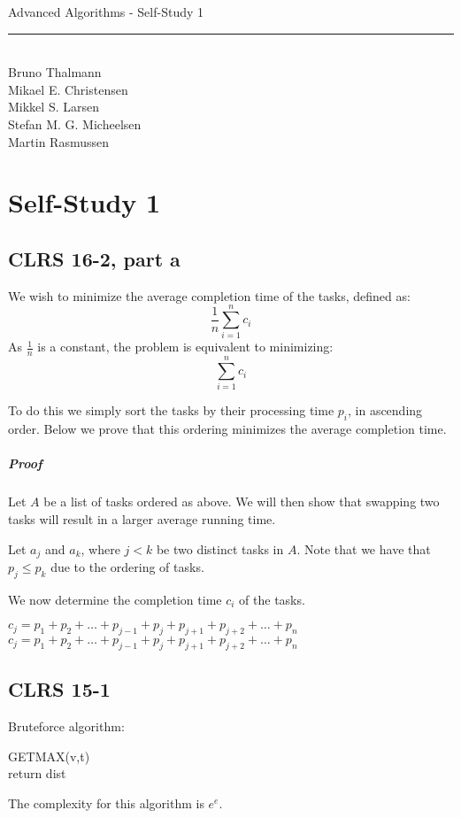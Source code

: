 
\newcommand{\HRule}{\rule{\linewidth}{0.5mm}}


\begin{titlepage}
\centering
{\LARGE Advanced Algorithms - Self-Study 1}
\HRule \\[0.5cm]
Bruno Thalmann\\
			Mikael E. Christensen\\
			Mikkel S. Larsen\\
			Stefan M. G. Micheelsen\\
			Martin Rasmussen
\end{titlepage}

\chapter*{Self-Study 1}

\section*{CLRS 16-2, part a}
We wish to minimize the average completion time of the tasks, defined as:
$$\frac{1}{n}\sum_{i=1}^{n}c_i$$
As $\frac{1}{n}$ is a constant, the problem is equivalent to minimizing:
$$\sum_{i=1}^{n}c_i$$

To do this we simply sort the tasks by their processing time $p_i$, in ascending order.
Below we prove that this ordering minimizes the average completion time.

\paragraph{Proof}
Let $A$ be a list of tasks ordered as above.
We will then show that swapping two tasks will result in a larger average running time.

Let $a_j$ and $a_k$, where $j < k$ be two distinct tasks in $A$.
Note that we have that $p_j \leq p_k$ due to the ordering of tasks.

We now determine the completion time $c_i$ of the tasks.


$c_j=p_1+p_2+\dots+p_{j-1}+p_j + p_{j+1} + p_{j+2} + \dots + p_n$\\
$c_{j}=p_1+p_2+\dots+p_{j-1}+p_j + p_{j+1} + p_{j+2} + \dots + p_n$\\

\section*{CLRS 15-1}
Bruteforce algorithm:

\begin{algorithm}[H]
GETMAX(v,t)
\\
return dist
\end{algorithm}
The complexity for this algorithm is $e^e$.
